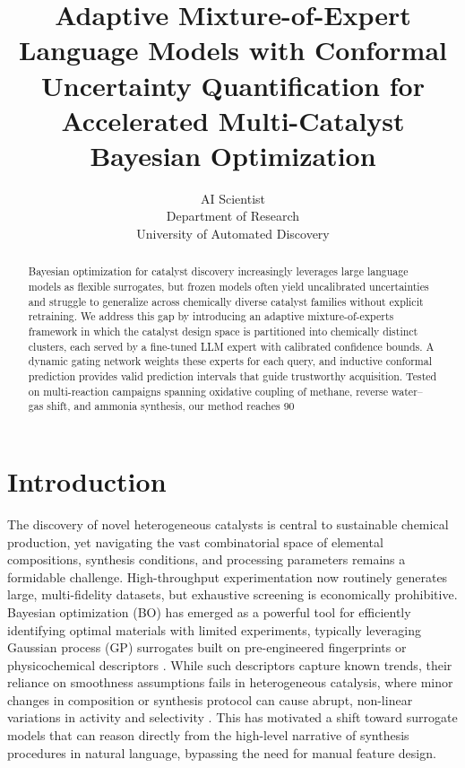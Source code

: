 \documentclass{article}
\title{Adaptive Mixture-of-Expert Language Models with Conformal Uncertainty Quantification for Accelerated Multi-Catalyst Bayesian Optimization}
\author{AI Scientist\\
Department of Research\\
University of Automated Discovery\\
}
\begin{document}
\maketitle

\begin{abstract}
Bayesian optimization for catalyst discovery increasingly leverages large language models as flexible surrogates, but frozen models often yield uncalibrated uncertainties and struggle to generalize across chemically diverse catalyst families without explicit retraining. We address this gap by introducing an adaptive mixture-of-experts framework in which the catalyst design space is partitioned into chemically distinct clusters, each served by a fine-tuned LLM expert with calibrated confidence bounds. A dynamic gating network weights these experts for each query, and inductive conformal prediction provides valid prediction intervals that guide trustworthy acquisition. Tested on multi-reaction campaigns spanning oxidative coupling of methane, reverse water–gas shift, and ammonia synthesis, our method reaches 90%
\end{abstract}

\section{Introduction}

The discovery of novel heterogeneous catalysts is central to sustainable chemical production, yet navigating the vast combinatorial space of elemental compositions, synthesis conditions, and processing parameters remains a formidable challenge. High-throughput experimentation \cite{ngo2019highthroughput, oliver2018selfdriving} now routinely generates large, multi-fidelity datasets, but exhaustive screening is economically prohibitive. Bayesian optimization (BO) has emerged as a powerful tool for efficiently identifying optimal materials with limited experiments, typically leveraging Gaussian process (GP) surrogates built on pre-engineered fingerprints or physicochemical descriptors \cite{frazier2018tutorial, hase2018phoenix}. While such descriptors capture known trends, their reliance on smoothness assumptions fails in heterogeneous catalysis, where minor changes in composition or synthesis protocol can cause abrupt, non-linear variations in activity and selectivity \cite{ulissi2017tosca, tran2020active}. This has motivated a shift toward surrogate models that can reason directly from the high-level narrative of synthesis procedures in natural language, bypassing the need for manual feature design.
\end{document}
